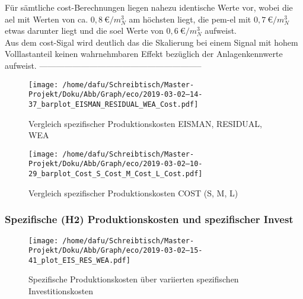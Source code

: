 \documentclass[onecolumn,10pt,titlepage]{article}
\begin{document}
Für sämtliche \gls{cost}-Berechnungen liegen nahezu identische Werte vor, wobei die \gls{ael} mit Werten von ca. $0,8~\euro{}/m^3_N$ am höchsten liegt, die  \gls{pem}-\gls{el} mit $0,7~\euro{}/m^3_N$ etwas darunter liegt und  die \gls{soel} Werte von $0,6~\euro{}/m^3_N$ aufweist.\\
Aus dem \gls{cost}-Sigal wird deutlich das die Skalierung bei einem Signal mit hohem Volllastanteil keinen wahrnehmbaren Effekt bezüglich der Anlagenkennwerte aufweist.
%
-----------------------------------------------------------
\begin{figure}[!tbp]
	\centering
	\begin{minipage}[b]{0.49\textwidth}
	\texttt{[image: /home/dafu/Schreibtisch/Master-Projekt/Doku/Abb/Graph/eco/2019-03-02--14-37\_barplot\_EISMAN\_RESIDUAL\_WEA\_Cost.pdf]}
\caption[Vergleich spezifischer Produktionskosten EIS,RES, WEA]{Vergleich spezifischer Produktionskosten EISMAN, RESIDUAL, WEA}
\label{fig:analy_nC_speCo} 
	\end{minipage}
	\hfill
	\begin{minipage}[b]{0.49\textwidth}
	\texttt{[image: /home/dafu/Schreibtisch/Master-Projekt/Doku/Abb/Graph/eco/2019-03-02--10-29\_barplot\_Cost\_S\_Cost\_M\_Cost\_L\_Cost.pdf]}
\caption[Vergleich spezifischer Produktionskosten COST]{Vergleich spezifischer Produktionskosten COST (S, M, L)}
\label{fig:analy_COST_speCo} 
	\end{minipage}
\end{figure}

\subsubsection{Spezifische (H2) Produktionskosten und spezifischer Invest}
\begin{figure}[H]
	
	\centering
	\texttt{[image: /home/dafu/Schreibtisch/Master-Projekt/Doku/Abb/Graph/eco/2019-03-02--15-41\_plot\_EIS\_RES\_WEA.pdf]}
	\caption[{Spezifische Produktionskosten; variierte Investitionskosten EIS, RES, WEA}]{Spezifische Produktionskosten über variierten spezifischen Investitionskosten }
	\label{fig:analy_ecoVAls_all} 
\end{figure}
\end{document}
